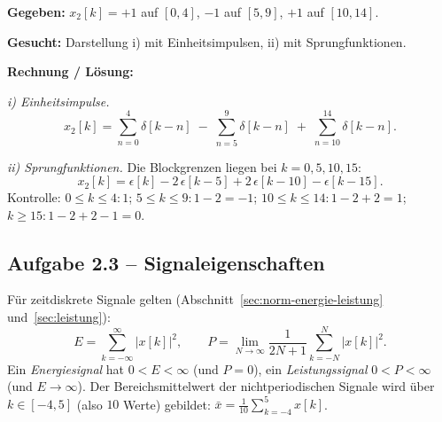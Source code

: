 \begin{beispiel}

\textbf{Gegeben:} $x_2[k]=+1$ auf $[0,4]$, $-1$ auf $[5,9]$, $+1$ auf $[10,14]$.

\textbf{Gesucht:} Darstellung i) mit Einheitsimpulsen, ii) mit Sprungfunktionen.

\textbf{Rechnung / Lösung:}

\emph{i) Einheitsimpulse.}
$$
x_2[k] = \sum_{n=0}^{4}\delta[k-n] \;-\; \sum_{n=5}^{9}\delta[k-n] \;+\; \sum_{n=10}^{14}\delta[k-n].
$$

\emph{ii) Sprungfunktionen.} Die Blockgrenzen liegen bei $k=0,5,10,15$:
$$
x_2[k] = \epsilon[k] - 2\,\epsilon[k-5] + 2\,\epsilon[k-10] - \epsilon[k-15].
$$
Kontrolle: $0\!\leq\! k\!\leq\!4\!:1$;\; $5\!\leq\! k\!\leq\!9\!:1-2=-1$;\;
$10\!\leq\! k\!\leq\!14\!:1-2+2=1$;\; $k\geq 15\!:1-2+2-1=0$. \checkmark

\begin{center}
\end{center}
\end{beispiel}

\subsection*{Aufgabe 2.3 – Signaleigenschaften}

Für zeitdiskrete Signale gelten (Abschnitt~\ref{sec:norm-energie-leistung} und~\ref{sec:leistung}):
$$
E = \sum_{k=-\infty}^{\infty} |x[k]|^2,
\qquad
P = \lim_{N\to\infty} \frac{1}{2N+1}\sum_{k=-N}^{N} |x[k]|^2.
$$
Ein \emph{Energiesignal} hat $0<E<\infty$ (und $P=0$), ein \emph{Leistungssignal}
$0<P<\infty$ (und $E\to\infty$). Der Bereichsmittelwert der nichtperiodischen
Signale wird über $k\in[-4,5]$ (also $10$ Werte) gebildet:
$\bar{x} = \tfrac{1}{10}\sum_{k=-4}^{5} x[k]$.

